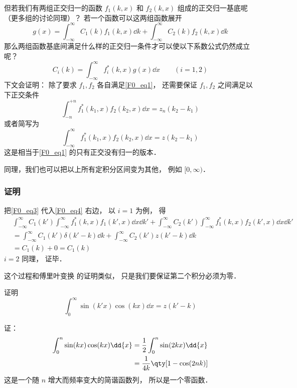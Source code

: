 但若我们有两组正交归一的函数 $f_1(k, x)$ 和 $f_2(k, x)$ 组成的正交归一基底呢（更多组的讨论同理）？ 若一个函数可以这两组函数展开
\begin{equation}\label{F0_eq3}
g(x) = \int_{-\infty}^{\infty} C_1(k) f_1(k, x) \dd{k} + \int_{-\infty}^{\infty} C_2(k) f_2(k, x) \dd{k}
\end{equation}
那么两组函数基底间满足什么样的正交归一条件才可以使以下系数公式仍然成立呢？
\begin{equation}\label{F0_eq4}
C_i(k) = \int_{-\infty}^{\infty} f_i^*(k, x)g(x)\dd{x} \qquad (i = 1,2)
\end{equation}
下文会证明： 除了要求 $f_1, f_2$ 各自满足\autoref{F0_eq1}， 还需要保证 $f_1, f_2$ 之间满足以下正交条件
\begin{equation}
\int_{-n}^{+n} f_1^*(k_1, x) f_2(k_2, x) \dd{x} = z_n(k_2 - k_1)
\end{equation}
或者简写为
\begin{equation}
\int_{-\infty}^{\infty} f_1^*(k_1, x) f_2(k_2, x) \dd{x} = z(k_2 - k_1)
\end{equation}
这是相当于\autoref{F0_eq1} 的只有正交没有归一的版本．

同理，我们也可以把以上所有定积分区间变为其他， 例如 $[0, \infty)$．

\subsubsection{证明}
把\autoref{F0_eq3} 代入\autoref{F0_eq4} 右边， 以 $i = 1$ 为例， 得
\begin{equation}
\begin{aligned}
&\int_{-\infty}^{\infty} C_1(k') \int_{-\infty}^{\infty} f_1^*(k, x) f_1(k', x)\dd{x} \dd{k'} + \int_{-\infty}^{\infty} C_2(k') \int_{-\infty}^{\infty} f_1^*(k, x)f_2(k', x)\dd{x} \dd{k'}\\
&= \int_{-\infty}^{\infty} C_1(k') \delta(k' - k) \dd{k} + \int_{-\infty}^{\infty} C_2(k') z(k' - k) \dd{k}\\
&= C_1(k) + 0 = C_1(k)
\end{aligned}
\end{equation}
$i = 2$ 同理， 证毕．

这个过程和傅里叶变换 的证明类似， 只是我们要保证第二个积分必须为零．

\begin{example}{}
证明
\begin{equation}
\int_0^\infty \sin(k'x)\cos(kx) \dd{x} = z(k' - k)
\end{equation}

证：
\begin{equation}
\begin{aligned}
\int_0^n \sin(kx)\cos(kx) \dd{x} &= \frac{1}{2} \int_0^n \sin(2kx) \dd{x}\\
&= \frac{1}{4k} \qty[1 - \cos(2nk)]
\end{aligned}
\end{equation}
这是一个随 $n$ 增大而频率变大的简谐函数列， 所以是一个零函数．
\end{example}

